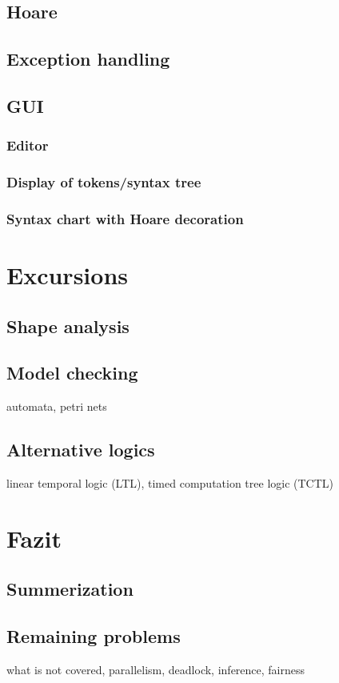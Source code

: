 \section{Hoare}

\section{Exception handling}

\section{GUI}

\subsection{Editor}
\subsection{Display of tokens/syntax tree}
\subsection{Syntax chart with Hoare decoration}

\chapter{Excursions}
\section{Shape analysis}
\section{Model checking}
automata, petri nets
\section{Alternative logics}
linear temporal logic (LTL), timed computation tree logic (TCTL)

\chapter{Fazit}
\section{Summerization}
\section{Remaining problems}
what is not covered, parallelism, deadlock, inference, fairness
